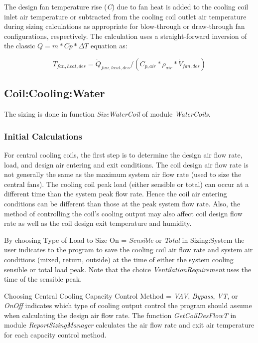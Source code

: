 The design fan temperature rise (\emph{C}) due to fan heat is added to the cooling coil inlet air temperature or subtracted from the cooling coil outlet air temperature during sizing calculations as appropriate for blow-through or draw-through fan configurations, respectively. The calculation uses a straight-forward inversion of the classic \(Q = \dot{m}*Cp*\Delta{T}\) equation as:

\begin{equation}
T_{fan,heat,des} = \dot{Q}_{fan,heat,des} / ( {C}_{p,air} * \rho_{air} * \dot{V}_{fan,des} )
\end{equation}

\subsection{Coil:Cooling:Water}\label{coilcoolingwater}

The sizing is done in function \emph{SizeWaterCoil} of module \emph{WaterCoils}.

\subsubsection{Initial Calculations}\label{initial-calculations}

For central cooling coils, the first step is to determine the design air flow rate, load, and design air entering and exit conditions. The coil design air flow rate is not generally the same as the maximum system air flow rate (used to size the central fans). The cooling coil peak load (either sensible or total) can occur at a different time than the system peak flow rate. Hence the coil air entering conditions can be different than those at the peak system flow rate. Also, the method of controlling the coil's cooling output may also affect coil design flow rate as well as the coil design exit temperature and humidity.

By choosing Type of Load to Size On = \emph{Sensible} or \emph{Total} in Sizing:System the user indicates to the program to save the cooling coil air flow rate and system air conditions (mixed, return, outside) at the time of either the system cooling sensible or total load peak. Note that the choice \emph{VentilationRequirement} uses the time of the sensible peak.

Choosing Central Cooling Capacity Control Method = \emph{VAV}, \emph{Bypass}, \emph{VT}, or \emph{OnOff} indicates which type of cooling output control the program should assume when calculating the design air flow rate. The function \emph{GetCoilDesFlowT} in module \emph{ReportSizingManager} calculates the air flow rate and exit air temperature for each capacity control method.

